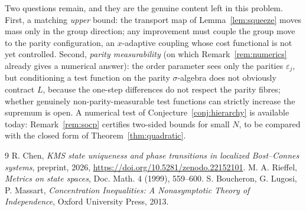 \documentclass[11pt]{amsart}
\theoremstyle{remark}
\newcommand{\Lip}{L}
\begin{document}
Two questions remain, and they are the genuine content left in this problem. First, a
matching \emph{upper} bound: the transport map of Lemma~\ref{lem:squeeze} moves mass only
in the group direction; any improvement must couple the group move to the parity
configuration, an $x$-adaptive coupling whose cost functional is not yet controlled.
Second, \emph{parity measurability} (on which Remark~\ref{rem:numerics} already gives a numerical answer): the order parameter sees only the parities
$\varepsilon_j$, but conditioning a test function on the parity $\sigma$-algebra does not
obviously contract $\Lip$, because the one-step differences do not respect the parity
fibres; whether genuinely non-parity-measurable test functions can strictly increase the
supremum is open. A numerical test of Conjecture~\ref{conj:hierarchy} is available today:
Remark~\ref{rem:socp} certifies two-sided bounds for small $N$, to be compared with the
closed form of Theorem~\ref{thm:quadratic}.

\begin{thebibliography}{9}
 R. Chen, \emph{KMS state uniqueness and phase transitions in localized Bost--Connes systems}, preprint, 2026, \newline\url{https://doi.org/10.5281/zenodo.22152101}.
 M. A. Rieffel, \emph{Metrics on state spaces}, Doc. Math. 4 (1999), 559--600.
 S. Boucheron, G. Lugosi, P. Massart, \emph{Concentration Inequalities: A Nonasymptotic Theory of Independence}, Oxford University Press, 2013.
\end{thebibliography}
\end{document}
